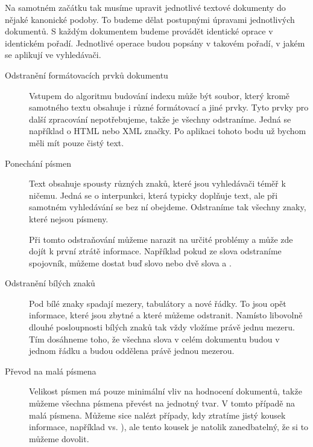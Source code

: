 \documentclass[12pt]{article}
\newcommand{\code}[1]{\texttt{#1}}
\begin{document}
Na samotném začátku tak musíme upravit jednotlivé textové dokumenty do nějaké kanonické podoby. To budeme dělat postupnými úpravami jednotlivých dokumentů. S každým dokumentem budeme provádět identické oprace v identickém pořadí. Jednotlivé operace budou popsány v takovém pořadí, v jakém se aplikují ve vyhledávači. 

\begin{description}

\item[Odstranění formátovacích prvků dokumentu] Vstupem do algoritmu budování indexu může být soubor, který kromě samotného textu obsahuje i různé formátovací a jiné prvky. Tyto prvky pro další zpracování nepotřebujeme, takže je všechny odstraníme. Jedná se například o HTML nebo XML značky. Po aplikaci tohoto bodu už bychom měli mít pouze čistý text. 

\item[Ponechání písmen] Text obsahuje spousty různých znaků, které jsou vyhledávači téměř k ničemu. Jedná se o interpunkci, která typicky doplňuje text, ale při samotném vyhledávání se bez ní obejdeme. Odstraníme tak všechny znaky, které nejsou písmeny. 

Při tomto odstraňování můžeme narazit na určité problémy a může zde dojít k první ztrátě informace. Například pokud ze slova  odstraníme spojovník, můžeme dostat buď slovo  nebo dvě slova  a . 

\item[Odstranění bílých znaků] Pod bílé znaky spadají mezery, tabulátory a nové řádky. To jsou opět informace, které jsou zbytné a které můžeme odstranit. Namísto libovolně dlouhé posloupnosti bílých znaků tak vždy vložíme právě jednu mezeru. Tím dosáhneme toho, že všechna slova v celém dokumentu budou v jednom řádku a budou oddělena právě jednou mezerou. 

\item[Převod na malá písmena] Velikost písmen má pouze minimální vliv na hodnocení dokumentů, takže můžeme všechna písmena převést na jednotný tvar. V tomto případě na malá písmena. Můžeme sice nalézt případy, kdy ztratíme jistý kousek informace, například  vs. ), ale tento kousek je natolik zanedbatelný, že si to můžeme dovolit. 


\end{description}
\end{document}
